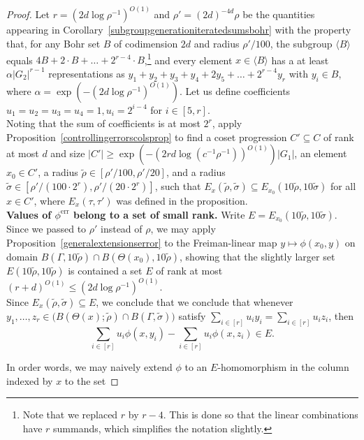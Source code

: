 \documentclass[a4paper,11pt]{article}
\numberwithin{theorem}{section}
\theoremstyle{definition}
\begin{document}
\begin{proof}
    Let $r = (2 d \log \rho^{-1})^{O(1)}$ and $\rho' = (2d)^{-4d}\rho$ be the quantities appearing in Corollary~\ref{subgroupgenerationiteratedsumsbohr} with the property that, for any Bohr set $B$ of codimension $2d$ and radius $\rho'/100$, the subgroup $\langle B \rangle$ equals $4B + 2\cdot B + \dots + 2^{r - 4} \cdot B$,\footnote{Note that we replaced $r$ by $r-4$. This is done so that the linear combinations have $r$ summands, which simplifies the notation slightly.} and every element $x \in \langle B \rangle$ has a at least $\alpha |G_2|^{r-1}$ representations as $y_1 + y_2 + y_3 + y_4 + 2y_5 + \dots + 2^{r-4} y_r$ with $y_i \in B$, where $\alpha = \exp(-(2d \log \rho^{-1})^{O(1)})$. Let us define coefficients $u_1 = u_2 = u_3 = u_4 = 1,  u_i = 2^{i - 4}$ for $i \in [5,r]$.\\

   Noting that the sum of coefficients is at most $2^r$, apply Proposition~\ref{controllingerrorscolsprop} to find a coset progression $C' \subseteq C$ of rank at most $d$ and size $|C'| \geq \exp(-(2rd\log(c^{-1} \rho^{-1}))^{O(1)}) |G_1|$, an element $x_0 \in C'$, a radius $\tilde{\rho} \in [\rho' / 100, \rho'/20]$, and a radius $\tilde{\sigma} \in [\rho' / (100\cdot 2^r), \rho' / (20\cdot 2^r)]$, such that $E_x(\tilde{\rho}, \tilde{\sigma}) \subseteq E_{x_0}(10\tilde{\rho}, 10\tilde{\sigma})$ for all $x \in C'$, where $E_x(\tau, \tau')$ was defined in the proposition.\\

   \noindent\textbf{Values of $\phi^{\text{err}}$ belong to a set of small rank.} Write $E = E_{x_0}(10\tilde{\rho}, 10\tilde{\sigma})$. Since we passed to $\rho'$ instead of $\rho$, we may apply Proposition~\ref{generalextensionserror} to the Freiman-linear map $y \mapsto \phi(x_0, y)$ on domain $B(\Gamma, 10\tilde{\rho}) \cap B(\Theta(x_0), 10\tilde{\rho})$, showing that the slightly larger set $E(10\tilde{\rho}, 10\tilde{\rho})$ is contained a set $E$ of rank at most $(r + d )^{O(1)} \leq (2 d \log \rho^{-1})^{O(1)}$.\\

   Since $E_x(\tilde{\rho}, \tilde{\sigma}) \subseteq E$, we conclude that we conclude that whenever $y_1, \dots, z_r \in \Big(B(\Theta(x); \tilde{\rho}) \cap B(\Gamma, \tilde{\sigma})\Big)$ satisfy $\sum_{i \in [r]} u_i y_i = \sum_{i \in [r]} u_i z_i$, then
\[\sum_{i \in [r]} u_i \phi(x, y_i) -  \sum_{i \in [r]} u_i \phi(x, z_i) \in E.\]

  In order words, we may naively extend $\phi$ to an $E$-homomorphism in the column indexed by $x$ to the set
  

\end{proof}
\end{document}
